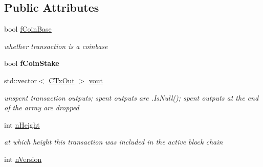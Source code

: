 \subsection*{Public Attributes}
\begin{DoxyCompactItemize}
\item 
\mbox{\label{class_c_coins_adeedfaef84ba39b6e295d5d1fb9d8f0b}} 
bool \mbox{\hyperlink{class_c_coins_adeedfaef84ba39b6e295d5d1fb9d8f0b}{f\+Coin\+Base}}
\begin{DoxyCompactList}\small\item\em whether transaction is a coinbase \end{DoxyCompactList}\item 
\mbox{\label{class_c_coins_acdb04fc05b8c2b5a75914c8aaedcd27d}} 
bool {\bfseries f\+Coin\+Stake}
\item 
\mbox{\label{class_c_coins_a1dcea1a6da9b25642337e286f9f59b03}} 
std\+::vector$<$ \mbox{\hyperlink{class_c_tx_out}{C\+Tx\+Out}} $>$ \mbox{\hyperlink{class_c_coins_a1dcea1a6da9b25642337e286f9f59b03}{vout}}
\begin{DoxyCompactList}\small\item\em unspent transaction outputs; spent outputs are .Is\+Null(); spent outputs at the end of the array are dropped \end{DoxyCompactList}\item 
\mbox{\label{class_c_coins_af7396dfad71367de46f21cf92e2c70ab}} 
int \mbox{\hyperlink{class_c_coins_af7396dfad71367de46f21cf92e2c70ab}{n\+Height}}
\begin{DoxyCompactList}\small\item\em at which height this transaction was included in the active block chain \end{DoxyCompactList}\item 
int \mbox{\hyperlink{class_c_coins_a96fea4ee8841e9ce32f60c2e7e3cf6b6}{n\+Version}}
\end{DoxyCompactItemize}
